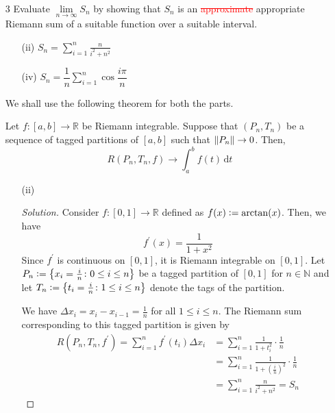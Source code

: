 \documentclass[12pt]{article}
\def\D{\mathrm{d}}
\def\ddfrac#1#2{\displaystyle\frac{\displaystyle #1}{\displaystyle #2}}
\theoremstyle{definition}
\newenvironment{soln}{\begin{proof}[Solution]}{\end{proof}}
\begin{document}
\begin{enumerate}[leftmargin=*]
    \newpage


    \item[3] Evaluate $\lim\limits_{n \to \infty} S_n$ by showing that $S_n$ is an \textcolor{red}{\sout{approximate}} appropriate Riemann sum of a suitable function over a suitable interval.
    
        \begin{multicols}{2}
    \begin{enumerate}[leftmargin=*]
        \item[(ii)] $S_n = \sum\limits_{i=1}^{n} \ddfrac{n}{i^2 + n^2}$
        \item[(iv)] $S_n = \dfrac{1}{n} \sum\limits_{i=1}^n \cos \dfrac{i\pi}{n}$
    \end{enumerate}
    \end{multicols}
    
    We shall use the following theorem for both the parts. 
    
    \begin{thm*}
        Let $f \colon [a,b] \to \mathbb{R}$ be Riemann integrable. Suppose that $(P_n, T_n)$ be a sequence of tagged partitions of $[a,b]$ such that $\norm{P_n} \to 0$. Then, 
        \[
            R(P_n, T_n, f) \to \int_a^b f(t) \, \D t
        \]
    \end{thm*}
    
    \begin{enumerate}[leftmargin=*]
    \item[(ii)]
    \begin{soln}
        Consider $f \colon [0,1] \to \mathbb{R}$ defined as $f(x) \vcentcolon= \arctan(x)$. Then, we have
        \[
            f^{\prime}(x) = \frac{1}{1+x^2}
        \]
        Since $f^{\prime}$ is continuous on $[0,1]$, it is Riemann integrable on $[0,1]$. Let $P_n \vcentcolon= \left\{ x_i = \frac{i}{n} \colon 0 \leq i \leq n \right\}$ be a tagged partition of $[0,1]$ for $n \in \mathbb{N}$ and let $T_n \vcentcolon= \left\{ t_i = \frac{i}{n} \colon 1 \leq i \leq n\right\}$ denote the tags of the partition. 
        
        \medskip
        
        We have $\Delta x_i = x_{i} - x_{i-1} = \frac{1}{n}$ for all $1 \leq i \leq n$. The Riemann sum corresponding to this tagged partition is given by 
        \begin{align*}
            R(P_n, T_n, f^{\prime}) = \sum_{i=1}^{n} f^{\prime}(t_i) \Delta x_i &= \sum_{i=1}^n \frac{1}{1+t_i^2} \cdot \frac{1}{n} \\
            &= \sum_{i=1}^n \frac{1}{1 + \left(\frac{i}{n} \right)^2 } \cdot \frac{1}{n} \\
            &= \sum_{i=1}^n \frac{n}{i^2 + n^2} = S_n
        \end{align*}
        

\end{soln}
\end{enumerate}
\end{enumerate}
\end{document}

